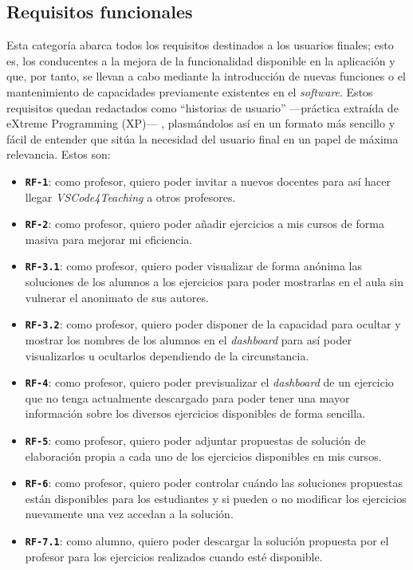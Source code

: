 \subsection{Requisitos funcionales}
\label{subsec:listaReqsFuncionales}
Esta categoría abarca todos los requisitos destinados a los usuarios finales; esto es, los conducentes a la mejora de la funcionalidad disponible en la aplicación y que, por tanto, se llevan a cabo mediante la introducción de nuevas funciones o el mantenimiento de capacidades previamente existentes en el \textit{software}. Estos requisitos quedan redactados como ``historias de usuario'' ---práctica extraída de eXtreme Programming (XP)--- \cite{XP_UserStories}, plasmándolos así en un formato más sencillo y fácil de entender que sitúa la necesidad del usuario final en un papel de máxima relevancia. Estos son:
\begin{itemize}
    \item \texttt{\textbf{RF-1}}: como profesor, quiero poder invitar a nuevos docentes para así hacer llegar \textit{VSCode4Teaching} a otros profesores.
    \item \texttt{\textbf{RF-2}}: como profesor, quiero poder añadir ejercicios a mis cursos de forma masiva para mejorar mi eficiencia.
    \item \texttt{\textbf{RF-3.1}}: como profesor, quiero poder visualizar de forma anónima las soluciones de los alumnos a los ejercicios para poder mostrarlas en el aula sin vulnerar el anonimato de sus autores.
    \item \texttt{\textbf{RF-3.2}}: como profesor, quiero poder disponer de la capacidad para ocultar y mostrar los nombres de los alumnos en el \textit{dashboard} para así poder visualizarlos u ocultarlos dependiendo de la circunstancia.
    \item \texttt{\textbf{RF-4}}: como profesor, quiero poder previsualizar el \textit{dashboard} de un ejercicio que no tenga actualmente descargado para poder tener una mayor información sobre los diversos ejercicios disponibles de forma sencilla.
    \item \texttt{\textbf{RF-5}}: como profesor, quiero poder adjuntar propuestas de solución de elaboración propia a cada uno de los ejercicios disponibles en mis cursos.
    \item \texttt{\textbf{RF-6}}: como profesor, quiero poder controlar cuándo las soluciones propuestas están disponibles para los estudiantes y si pueden o no modificar los ejercicios nuevamente una vez accedan a la solución.
    \item \texttt{\textbf{RF-7.1}}: como alumno, quiero poder descargar la solución propuesta por el profesor para los ejercicios realizados cuando esté disponible.

\end{itemize}

